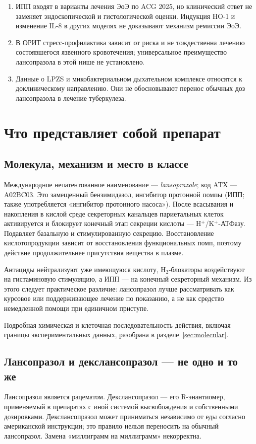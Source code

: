 \documentclass[11pt,a4paper,notitlepage]{report}
\newcommand{\src}[1]{\unskip\space\cite{#1}}
\begin{document}
\begin{enumerate}
\item ИПП входят в варианты лечения ЭоЭ по ACG 2025, но клинический ответ не заменяет эндоскопической и гистологической оценки. Индукция HO-1 и изменение IL-8 в других моделях не доказывают механизм ремиссии ЭоЭ.\src{eoe,molnrf2,molil8}
\item В ОРИТ стресс-профилактика зависит от риска и не тождественна лечению состоявшегося язвенного кровотечения; универсальное преимущество лансопразола в этой нише не установлено.\src{sccm,esge2026}
\item Данные о LPZS и микобактериальном дыхательном комплексе относятся к доклиническому направлению. Они не обосновывают перенос обычных доз лансопразола в лечение туберкулеза.\src{moltb,moltbstructure}
\end{enumerate}

\section{Что представляет собой препарат}
\label{sec:drug-profile}

\subsection{Молекула, механизм и место в классе}
Международное непатентованное наименование --- \textit{lansoprazole}; код ATХ --- A02BC03. Это замещенный бензимидазол, ингибитор протонной помпы (ИПП; также употребляется «ингибитор протонного насоса»). После всасывания и накопления в кислой среде секреторных канальцев париетальных клеток активируется и блокирует конечный этап секреции кислоты --- H$^+$/K$^+$-АТФазу. Подавляет базальную и стимулированную секрецию. Восстановление кислотопродукции зависит от восстановления функциональных помп, поэтому действие продолжительнее присутствия вещества в плазме.\src{pharmalabel,hpra}

Антациды нейтрализуют уже имеющуюся кислоту, H$_2$-блокаторы воздействуют на гистаминовую стимуляцию, а ИПП --- на конечный секреторный механизм. Из этого следует практическое различие: лансопразол лучше рассматривать как курсовое или поддерживающее лечение по показанию, а не как средство немедленной помощи при единичном приступе.\src{pharmalabel,otc}

Подробная химическая и клеточная последовательность действия, включая границы экспериментальных данных, разобрана в разделе~\ref{sec:molecular}.

\subsection{Лансопразол и декслансопразол --- не одно и то же}
Лансопразол является рацематом. Декслансопразол --- его R-энантиомер, применяемый в препаратах с иной системой высвобождения и собственными дозировками. Декслансопразол может приниматься независимо от еды согласно американской инструкции; это правило нельзя переносить на обычный лансопразол. Замена «миллиграмм на миллиграмм» некорректна.\src{dexlabel,pharmalabel}
\end{document}

